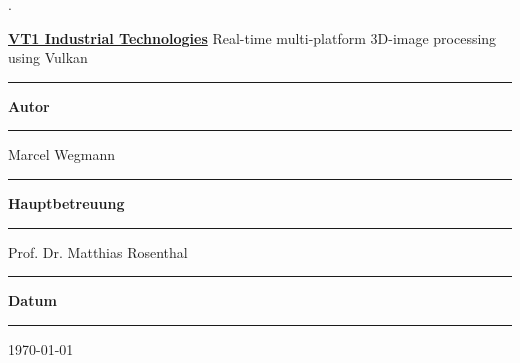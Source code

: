 \begin{titlepage}


\begin{minipage}[b]{0.010\textwidth}
\hskip 0.05cm
\end{minipage}
\begin{minipage}[b]{0.90\textwidth}
\begin{tiny}.\end{tiny}\vskip 2.8cm
	{\huge

	\textbf{\underline{VT1 Industrial Technologies}}
	\hskip 5cm
	\vskip 2cm
	Real-time multi-platform 3D-image processing using Vulkan
	\vskip 0.5cm}

	\begin{minipage}[b]{0.25\textwidth}
	\hrule\vskip 0.5cm
		\textbf{Autor}
	\end{minipage}
	\begin{minipage}[b]{0.03\textwidth}
	\hskip 0.5cm
	\end{minipage}
	\begin{minipage}[b]{0.7\textwidth}
	\hrule\vskip 0.5cm
		Marcel Wegmann
	\end{minipage}
	\vskip 0.5cm
	\begin{minipage}[b]{0.25\textwidth}
	\hrule\vskip 0.5cm
		\textbf{Hauptbetreuung}
	\end{minipage}
	\begin{minipage}[b]{0.03\textwidth}
	\hskip 0.5cm
	\end{minipage}
	\begin{minipage}[b]{0.7\textwidth}
	\hrule\vskip 0.5cm
		Prof. Dr. Matthias Rosenthal
	\end{minipage}

	\vskip 0.5cm
	\begin{minipage}[b]{0.25\textwidth}
	\hrule\vskip 0.5cm
		\textbf{Datum}
	\end{minipage}
	\begin{minipage}[b]{0.03\textwidth}
	\hskip 0.5cm
	\end{minipage}
	\begin{minipage}[b]{0.7\textwidth}
	\hrule\vskip 0.5cm
		\today
	\end{minipage}
\end{minipage}
\vskip 0.5cm


\end{titlepage}
